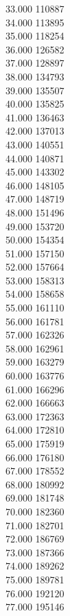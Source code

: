 { 33.000	110887 \\
 34.000	113895 \\
 35.000	118254 \\
 36.000	126582 \\
 37.000	128897 \\
 38.000	134793 \\
 39.000	135507 \\
 40.000	135825 \\
 41.000	136463 \\
 42.000	137013 \\
 43.000	140551 \\
 44.000	140871 \\
 45.000	143302 \\
 46.000	148105 \\
 47.000	148719 \\
 48.000	151496 \\
 49.000	153720 \\
 50.000	154354 \\
 51.000	157150 \\
 52.000	157664 \\
 53.000	158313 \\
 54.000	158658 \\
 55.000	161110 \\
 56.000	161781 \\
 57.000	162326 \\
 58.000	162961 \\
 59.000	163279 \\
 60.000	163776 \\
 61.000	166296 \\
 62.000	166663 \\
 63.000	172363 \\
 64.000	172810 \\
 65.000	175919 \\
 66.000	176180 \\
 67.000	178552 \\
 68.000	180992 \\
 69.000	181748 \\
 70.000	182360 \\
 71.000	182701 \\
 72.000	186769 \\
 73.000	187366 \\
 74.000	189262 \\
 75.000	189781 \\
 76.000	192120 \\
 77.000	195146 \\
}
